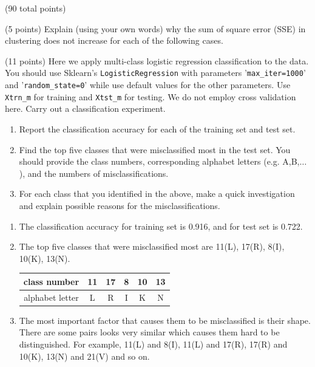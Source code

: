 \documentclass[12pt]{article}
\begin{document}
\begin{question}{(90 total points) \qTwoTitle}
\begin{subquestion}{(5 points)
    Explain (using your own words) why the sum of square error (SSE) in \kmeans clustering does not increase for each of the following cases.
  }
\end{subquestion}

\begin{subquestion}{(11 points)
    Here we apply multi-class logistic regression classification to the data. You should use Sklearn's {\tt LogisticRegression} with parameters '{\tt max\_iter=1000}' and '{\tt random\_state=0}' while use default values for the other parameters.
    Use {\tt Xtrn\_m} for training and {\tt Xtst\_m} for testing. We do not employ cross validation here.
    Carry out a classification experiment.
  }\label{q2:LR}
  \begin{enumerate}\NARROWITEM
  \item Report the classification accuracy for each of the training set and test set. 
  \item Find the top five classes that were misclassified most in the test set. You should provide the class numbers, corresponding alphabet letters (e.g. A,B,$\ldots$), and the numbers of misclassifications.
  \item For each class that you identified in the above, make a quick investigation and explain possible reasons for the misclassifications.
  \end{enumerate}
   

  \begin{answerbox}{0.7\textheight}
    \begin{enumerate}
    \item The classification accuracy for training set is 0.916, and for test set is 0.722.
    \item The top five classes that were misclassified most are 11(L), 17(R), 8(I), 10(K), 13(N).
        \begin{center}
        \begin{tabular}{c|c|c|c|c|c} \hline
             class number&11&17&8&10&13 \\ \hline
             alphabet letter&L&R&I&K&N \\ \hline
        \end{tabular}
    \end{center}
    \item The most important factor that causes them to be misclassified is their shape. There are some pairs looks very similar which causes them hard to be distinguished. For example, 11(L) and 8(I), 11(L) and 17(R), 17(R) and 10(K), 13(N) and 21(V) and so on.
    \end{enumerate}
  \end{answerbox}
  



\end{subquestion}
\end{question}
\end{document}
